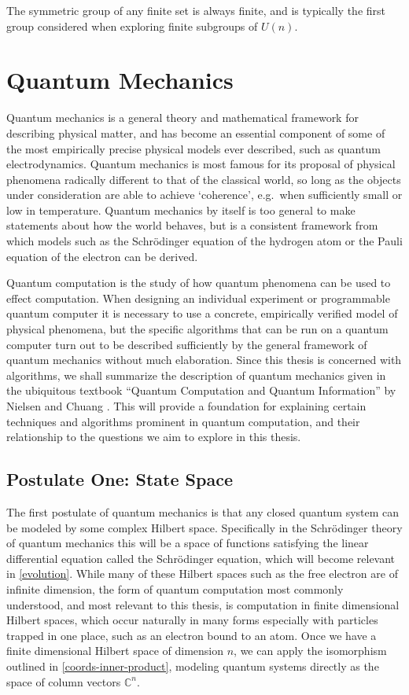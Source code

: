 The symmetric group of any finite set is always finite, and is typically the first group considered when exploring finite subgroups of $U(n)$.

\section{Quantum Mechanics}\label{qm}

Quantum mechanics is a general theory and mathematical framework for describing physical matter, and has become an essential component of some of the most empirically precise physical models ever described, such as quantum electrodynamics. Quantum mechanics is most famous for its proposal of physical phenomena radically different to that of the classical world, so long as the objects under consideration are able to achieve `coherence', e.g.\ when sufficiently small or low in temperature. Quantum mechanics by itself is too general to make statements about how the world behaves, but is a consistent framework from which models such as the Schrödinger equation of the hydrogen atom or the Pauli equation of the electron can be derived.

Quantum computation is the study of how quantum phenomena can be used to effect computation. When designing an individual experiment or programmable quantum computer it is necessary to use a concrete, empirically verified model of physical phenomena, but the specific algorithms that can be run on a quantum computer turn out to be described sufficiently by the general framework of quantum mechanics without much elaboration. Since this thesis is concerned with algorithms, we shall summarize the description of quantum mechanics given in the ubiquitous textbook ``Quantum Computation and Quantum Information'' by Nielsen and Chuang \cite{textbook}. This will provide a foundation for explaining certain techniques and algorithms prominent in quantum computation, and their relationship to the questions we aim to explore in this thesis.
\subsection{Postulate One: State Space}
The first postulate of quantum mechanics is that any closed quantum system can be modeled by some complex Hilbert space. Specifically in the Schrödinger theory of quantum mechanics this will be a space of functions satisfying the linear differential equation called the Schrödinger equation, which will become relevant in \autoref{evolution}. While many of these Hilbert spaces such as the free electron are of infinite dimension, the form of quantum computation most commonly understood, and most relevant to this thesis, is computation in finite dimensional Hilbert spaces, which occur naturally in many forms especially with particles trapped in one place, such as an electron bound to an atom. Once we have a finite dimensional Hilbert space of dimension $n$, we can apply the isomorphism outlined in \autoref{coords-inner-product}, modeling quantum systems directly as the space of column vectors $\mathbb{C}^n$.

